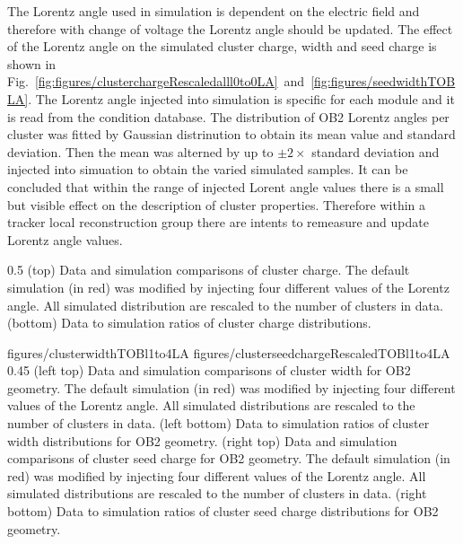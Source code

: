 The Lorentz angle used in simulation is dependent on the electric field and therefore with change of voltage the Lorentz angle should be updated. The effect of the Lorentz angle on the simulated cluster charge, width and seed charge is shown in Fig.~\ref{fig:figures/clusterchargeRescaledalll0to0LA}~and~\ref{fig:figures/seedwidthTOBLA}. The Lorentz angle injected into simulation is specific for each module and it is read from the condition database. The distribution of OB2 Lorentz angles per cluster was fitted by Gaussian distrinution to obtain its mean value and standard deviation. Then the mean was alterned by up to $\pm 2 \times$ standard deviation and injected into simuation to obtain the varied simulated samples. It can be concluded that within the range of injected Lorent angle values there is a small but visible effect on the description of cluster properties. Therefore within a tracker local reconstruction group there are intents to remeasure and update Lorentz angle values.


                 {0.5}       %
                 { (top) Data and simulation comparisons of cluster charge. The default simulation (in red) was modified by injecting four different values of the Lorentz angle. All simulated distribution are rescaled to the number of clusters in data. (bottom) Data to simulation ratios of cluster charge distributions. }

                 {figures/clusterwidthTOBl1to4LA}
                 {figures/clusterseedchargeRescaledTOBl1to4LA} %
                 {0.45}       %
                 {(left top) Data and simulation  comparisons of cluster width for OB2 geometry. The default simulation (in red) was modified by injecting four different values of the Lorentz angle. All simulated distributions are rescaled to the number of clusters in data. (left bottom) Data to simulation ratios of cluster width distributions for OB2 geometry. (right top) Data and simulation  comparisons of cluster seed charge for OB2 geometry. The default simulation (in red) was modified by injecting four different values of the Lorentz angle. All simulated distributions are rescaled to the number of clusters in data. (right bottom) Data to simulation ratios of cluster seed charge distributions for OB2 geometry. }

